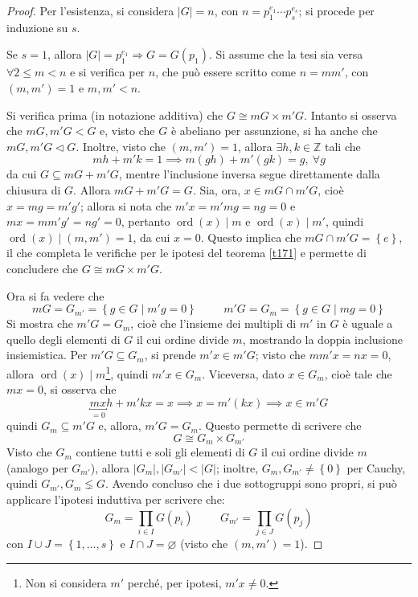 \documentclass[11pt]{article}
\theoremstyle{style}
\numberwithin{equation}{subsection}
\begin{document}
	\begin{proof}
		Per l'esistenza, si considera $\lvert G \rvert =n$, con $n= p_1^{e_1}\cdots p_s^{e_s}$; si procede per induzione su $s$.

		Se $s=1$, allora $\lvert G \rvert =p_1^{e_1}\Rightarrow G=G(p_1)$.
		Si assume che la tesi sia versa $\forall 2\le m<n$ e si verifica per $n$, che pu\`o essere scritto come $n = m m'$, con $(m,m') = 1$ e $m,m' < n$.
		
		Si verifica prima (in notazione additiva) che $G \cong mG \times m' G$.
		Intanto si osserva che $mG,m'G < G$ e, visto che $G$ \`e abeliano per assunzione, si ha anche che $mG,m'G\lhd G$.
		Inoltre, visto che $(m,m') = 1$, allora $\exists h,k \in \mathbb{Z}$ tali che 
		\[
		mh + m'k =1 \implies m(gh) +m'(gk) =g, \ \forall g
		\] 
		da cui $G \subseteq mG + m'G$, mentre l'inclusione inversa segue direttamente dalla chiusura di $G$. 
		Allora $mG + m'G = G$.
		Sia, ora, $x \in mG \cap m'G$, cio\`e $x = mg = m'g'$; allora si nota che $m'x= m'mg = ng = 0$ e $mx=mm'g' = ng' = 0$, pertanto $\operatorname{ord}(x)  \mid m$ e $\operatorname{ord}(x)  \mid m'$, quindi $\operatorname{ord}(x)  \mid (m,m') = 1$, da cui $x=0$.
		Questo implica che $mG\cap m'G = \left\{ e \right\} $, il che completa le verifiche per le ipotesi del teorema \ref{t171} e permette di concludere che $G \cong mG \times m'G$.

		Ora si fa vedere che 
		\[
		mG = G_{m'} = \left\{ g \in G  \mid m'g=0 \right\} \hspace{1cm} m'G = G_m = \left\{ g \in G \mid mg = 0 \right\} 
		\] 
		Si mostra che $m'G = G_m$, cio\`e che l'insieme dei multipli di $m'$ in $G$ \`e uguale a quello degli elementi di $G$ il cui ordine divide $m$, mostrando la doppia inclusione insiemistica.
		Per $m'G \subseteq G_m$, si prende $m'x \in m'G$; visto che $mm'x = n x = 0$, allora $\operatorname{ord}(x)  \mid m$\footnote{Non si considera $m'$ perch\'e, per ipotesi, $m'x\neq 0$.}, quindi $m'x \in G_m$.
		Viceversa, dato $x \in G_m$, cio\`e tale che $mx = 0$, si osserva che
		\[
			\underbracket{mx}_{=0} h + m'kx = x \implies x = m'(kx) \implies x \in  m'G
		\] 
		quindi $G_m \subseteq m'G$ e, allora, $m'G = G_m$.
		Questo permette di scrivere che 
		\[
		G \cong G_m \times G_{m'} 
		\] 
		Visto che $G_m$ contiene tutti e soli gli elementi di $G$ il cui ordine divide $m$ (analogo per $G_{m'} $), allora $\lvert G_m \rvert ,\lvert G_{m'}  \rvert < \lvert G \rvert $; inoltre, $G_{m} , G_{m'} \neq \left\{ 0 \right\} $ per Cauchy, quindi $G_{m'},G_m \lneq G $.
		Avendo concluso che i due sottogruppi sono propri, si pu\`o applicare l'ipotesi induttiva per scrivere che:
		\[
		G_m = \prod _{i\in I} G(p_i) \hspace{1cm}G_{m'} =\prod_{j \in J} G(p_j)
		\] 
		con $I\cup J = \left\{ 1, \ldots, s \right\} $ e $I\cap J = \varnothing$ (visto che $(m,m')=1$).


\end{proof}
\end{document}
